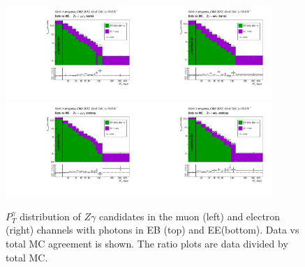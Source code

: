 \begin{figure}[htb]
  \begin{center}
   \includegraphics[width=0.45\textwidth]{../figs/figs_v11/MUON_ZGamma/PrepareYields/c_TotalDATAvsMC_Barrel__phoEt.pdf}\includegraphics[width=0.45\textwidth]{../figs/figs_v11/ELECTRON_ZGamma/PrepareYields/c_TotalDATAvsMC_Barrel__phoEt.pdf}
   \includegraphics[width=0.45\textwidth]{../figs/figs_v11/MUON_ZGamma/PrepareYields/c_TotalDATAvsMC_Endcap__phoEt.pdf}\includegraphics[width=0.45\textwidth]{../figs/figs_v11/ELECTRON_ZGamma/PrepareYields/c_TotalDATAvsMC_Endcap__phoEt.pdf}
  \caption{$P_T^{\gamma}$ distribution of $Z\gamma$ candidates in the muon (left) and electron (right) channels with photons in EB (top) and EE(bottom). Data vs total MC agreement is shown. The ratio plots are data divided by total MC.}
  \label{fig:DATAvsMC_Zg}
  \end{center}
\end{figure}

